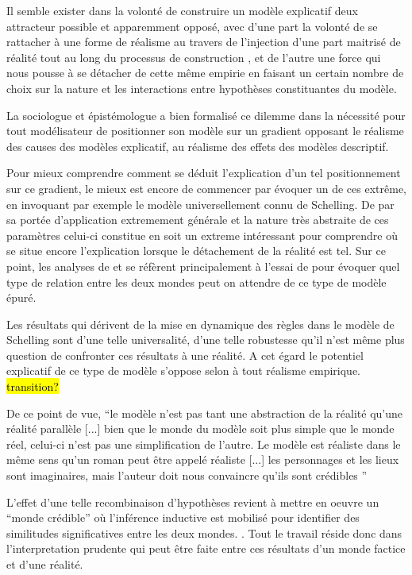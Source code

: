 Il semble exister dans la volonté de construire un modèle explicatif deux attracteur possible et apparemment opposé, avec d'une part la volonté de se rattacher à une forme de réalisme au travers de l'injection d'une part maitrisé de réalité tout au long du processus de construction , et de l'autre une force qui nous pousse à se détacher de cette même empirie en faisant un certain nombre de choix sur la nature et les interactions entre hypothèses constituantes du modèle.

La sociologue et épistémologue \textcite{Bulle2005} a bien formalisé ce dilemme dans la nécessité pour tout modélisateur de positionner son modèle sur un gradient opposant le réalisme des causes des modèles explicatif, au réalisme des effets des modèles descriptif. 

Pour mieux comprendre comment se déduit l'explication d'un tel positionnement sur ce gradient, le mieux est encore de commencer par évoquer un de ces extrême, en invoquant par exemple le modèle universellement connu de Schelling. De par sa portée d'application extremement générale et la nature très abstraite de ces paramètres celui-ci constitue en soit un extreme intéressant pour comprendre où se situe encore l'explication lorsque le détachement de la réalité est tel. Sur ce point, les analyses de \textcite{Bulle2005} et \textcite{Phan2008, Phan2010} se réfèrent principalement à l'essai de \textcite{Sugden2002} pour évoquer quel type de relation entre les deux mondes peut on attendre de ce type de modèle épuré. 

Les résultats qui dérivent de la mise en dynamique des règles dans le modèle de Schelling sont d'une telle universalité, d'une telle robustesse qu'il n'est même plus question de confronter ces résultats à une réalité. A cet égard le potentiel explicatif de ce type de modèle s'oppose selon \textcite{Bulle2005} à tout réalisme empirique. \hl{transition?}

De ce point de vue, \enquote{le modèle n'est pas tant une abstraction de la réalité qu’une réalité parallèle [...] bien que le monde du modèle soit plus simple que le monde réel, celui-ci n'est pas une simplification de l'autre. Le modèle est réaliste dans le même sens qu'un roman peut être appelé réaliste [...] les personnages et les lieux sont imaginaires, mais l'auteur doit nous convaincre qu'ils sont crédibles } \autocites[131]{Sugden2002}[10]{Phan2008}

L'effet d'une telle recombinaison d'hypothèses revient à mettre en oeuvre un \enquote{monde crédible} où l'inférence inductive est mobilisé pour identifier des similitudes significatives entre les deux mondes. \autocites{Livet2006, Phan2008}. Tout le travail réside donc dans l'interpretation prudente qui peut être faite entre ces résultats d'un monde factice et d'une réalité.

